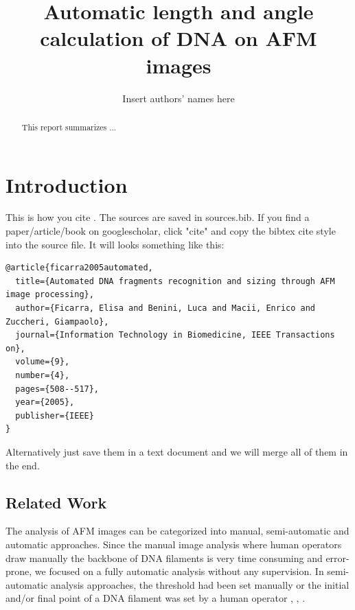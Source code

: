 \documentclass{article}
\begin{document}
%
\pagestyle{headings}  %
%
%

%

\title{Automatic length and angle calculation of DNA on AFM images}

\author{Insert authors' names here}

\maketitle  
\newpage
\tableofcontents
\newpage
%
\begin{abstract}
This report summarizes ...

\end{abstract}

\section{Introduction}
This is how you cite \cite{ficarra2005automated}.
The sources are saved in sources.bib. If you find a paper/article/book on googlescholar, click "cite" and copy the bibtex cite style into the source file. It will looks something like this:
\begin{verbatim}
@article{ficarra2005automated,
  title={Automated DNA fragments recognition and sizing through AFM image processing},
  author={Ficarra, Elisa and Benini, Luca and Macii, Enrico and Zuccheri, Giampaolo},
  journal={Information Technology in Biomedicine, IEEE Transactions on},
  volume={9},
  number={4},
  pages={508--517},
  year={2005},
  publisher={IEEE}
}
\end{verbatim}
Alternatively just save them in a text document and we will merge all of them in the end. 

\subsection{Related Work}


The analysis of AFM images can be categorized into manual, semi-automatic and automatic approaches. Since the manual image analysis where human operators draw manually the backbone of DNA filaments is very time consuming and error-prone, we focused on a fully automatic analysis without any supervision. In semi-automatic analysis approaches, the threshold had been set manually or the initial and/or final point of a DNA filament was set by a human operator \cite{wiggins2006high}, \cite{marek2005interactive}, \cite{cassina2016effects}.
\end{document}
